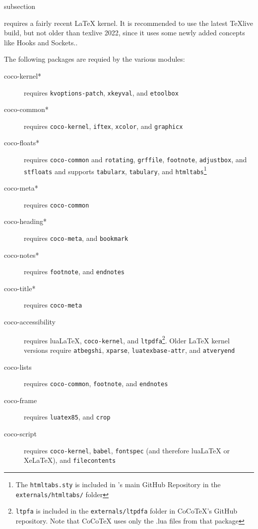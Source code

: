 \begin{Heading}{subsection}
\end{Heading}

{\CoCoTeX} requires a fairly recent LaTeX kernel. It is recommended to
use the latest TeXlive build, but not older than texlive 2022, since
it uses some newly added concepts like Hooks and Sockets..

The following packages are requied by the various {\CoCoTeX} modules:
\begin{description}
\item[\ttfamily coco-kernel*] requires \texttt{kvoptions-patch},
  \texttt{xkeyval}, and \texttt{etoolbox}
\item[\ttfamily coco-common*] requires \texttt{coco-kernel}, \texttt{iftex},
  \texttt{xcolor}, and \texttt{graphicx}
\item[\ttfamily coco-floats*] requires \texttt{coco-common} and
  \texttt{rotating}, \texttt{grffile}, \texttt{footnote},
  \texttt{adjustbox}, and \texttt{stfloats} and supports
  \texttt{tabularx}, \texttt{tabulary}, and
  \texttt{htmltabs}\footnote{The \texttt{htmltabs.sty} is included in
    \CoCoTeX's main GitHub Repository in the
    \texttt{externals/htmltabs/} folder}
\item[\ttfamily coco-meta*] requires \texttt{coco-common}
\item[\ttfamily coco-heading*] requires \texttt{coco-meta}, and
  \texttt{bookmark}
\item[\ttfamily coco-notes*] requires \texttt{footnote}, and \texttt{endnotes}
\item[\ttfamily coco-title*] requires \texttt{coco-meta}
\item[\ttfamily coco-accessibility] requires lua\LaTeX, \texttt{coco-kernel},
  and \texttt{ltpdfa}\footnote{\texttt{ltpfa} is included in the
    \texttt{externals/ltpdfa} folder in CoCoTeX's GitHub
    repository. Note that CoCoTeX uses only the .lua files from that
    package}. Older {\LaTeX} kernel versions require
  \texttt{atbegshi}, \texttt{xparse}, \texttt{luatexbase-attr}, and
  \texttt{atveryend}
\item[\ttfamily coco-lists] requires \texttt{coco-common}, \texttt{footnote},
  and \texttt{endnotes}
\item[\ttfamily coco-frame] requires \texttt{luatex85}, and \texttt{crop}
\item[\ttfamily coco-script] requires \texttt{coco-kernel}, \texttt{babel},
  \texttt{fontspec} (and therefore {lua\LaTeX} or Xe\LaTeX), and
  \texttt{filecontents}
\end{description}

